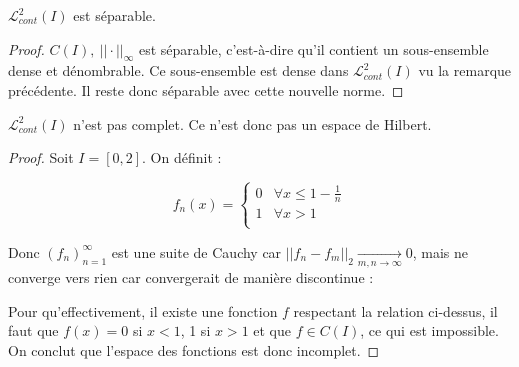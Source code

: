 \begin{theo}
    $\mathcal{L}_{cont}^2(I)$ est séparable.
\end{theo}
\begin{proof}
    $C(I),\ ||\cdot||_\infty$ est séparable, c'est-à-dire qu'il contient un sous-ensemble dense et dénombrable. Ce sous-ensemble est dense dans $\mathcal{L}_{cont}^2(I)$ vu la remarque précédente. Il reste donc séparable avec cette nouvelle norme.
\end{proof}

\begin{theo}
    $\mathcal{L}_{cont}^2(I)$ n'est pas complet. Ce n'est donc pas un espace de Hilbert.
\end{theo}
\begin{proof}
    Soit $I=[0,2]$. On définit : 
    \begin{center}
        \begin{minipage}{0.2\textwidth}
        \end{minipage}
        \begin{minipage}{0.5\textwidth}
            \begin{equation*}
                f_n(x) = \left\{\begin{array}{ll}
                    0 & \forall x \leq 1 - \frac{1}{n}\\
                    1 & \forall x > 1\\
                    \end{array}\right.
            \end{equation*}
        \end{minipage}
    \end{center}
    Donc $(f_n)_{n=1}^\infty$ est une suite de Cauchy car $||f_n - f_m||_2 \underset{m,n\to\infty}{\longrightarrow} 0$, mais ne converge vers rien car convergerait de manière discontinue :
    \begin{center}\end{center}
    Pour qu'effectivement, il existe une fonction $f$ respectant la relation ci-dessus, il faut que $f(x) = 0$ si $x<1$, 1 si $x>1$ et que $f\in C(I)$, ce qui est impossible. On conclut que l'espace des fonctions est donc incomplet.
\end{proof}

